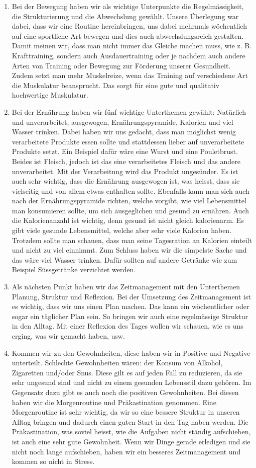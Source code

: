 \begin{enumerate}
  \item Bei der Bewegung haben wir als wichtige Unterpunkte die Regelmässigkeit, die Strukturierung und die Abwechslung gewählt. Unsere Überlegung war dabei, dass wir eine Routine hereinbringen, uns dabei mehrmals wöchentlich auf eine sportliche Art bewegen und dies auch abwechslungsreich gestalten. Damit meinen wir, dass man nicht immer das Gleiche machen muss, wie z. B. Krafttraining, sondern auch Ausdauertraining oder je nachdem auch andere Arten von Training oder Bewegung zur Förderung unserer Gesundheit. Zudem setzt man mehr Muskelreize, wenn das Training auf verschiedene Art die Muskulatur beansprucht. Das sorgt für eine gute und qualitativ hochwertige Muskulatur.
  \item Bei der Ernährung haben wir fünf wichtige Unterthemen gewählt: Natürlich und unverarbeitet, ausgewogen, Ernährungspyramide, Kalorien und viel Wasser trinken. Dabei haben wir uns gedacht, dass man möglichst wenig verarbeitete Produkte essen sollte und stattdessen lieber auf unverarbeitete Produkte setzt. Ein Beispiel dafür wäre eine Wurst und eine Pouletbrust. Beides ist Fleisch, jedoch ist das eine verarbeitetes Fleisch und das andere unverarbeitet. Mit der Verarbeitung wird das Produkt ungesünder. Es ist auch sehr wichtig, dass die Ernährung ausgewogen ist, was heisst, dass sie vielseitig und von allem etwas enthalten sollte. Ebenfalls kann man sich auch nach der Ernährungspyramide richten, welche vorgibt, wie viel Lebensmittel man konsumieren sollte, um sich ausgeglichen und gesund zu ernähren. Auch die Kalorienanzahl ist wichtig, denn gesund ist nicht gleich kalorienarm. Es gibt viele gesunde Lebensmittel, welche aber sehr viele Kalorien haben. Trotzdem sollte man schauen, dass man seine Tagesration an Kalorien einteilt und nicht zu viel einnimmt. Zum Schluss haben wir die simpelste Sache und das wäre viel Wasser trinken. Dafür sollten auf andere Getränke wie zum Beispiel Süssgetränke verzichtet werden.
  \item Als nächsten Punkt haben wir das Zeitmanagement mit den Unterthemen Planung, Struktur und Reflexion. Bei der Umsetzung des Zeitmanagement ist es wichtig, dass wir uns einen Plan machen. Das kann ein wöchentlicher oder sogar ein täglicher Plan sein. So bringen wir auch eine regelmässige Struktur in den Alltag. Mit einer Reflexion des Tages wollen wir schauen, wie es uns erging, was wir gemacht haben, usw.
  \item Kommen wir zu den Gewohnheiten, diese haben wir in Positive und Negative unterteilt. Schlechte Gewohnheiten wären: der Konsum von Alkohol, Zigaretten und/oder Snus. Diese gilt es auf jeden Fall zu reduzieren, da sie sehr ungesund sind und nicht zu einem gesunden Lebensstil dazu gehören. Im Gegensatz dazu gibt es auch noch die positiven Gewohnheiten. Bei diesen haben wir die Morgenroutine und Präkastination genommen. Eine Morgenroutine ist sehr wichtig, da wir so eine bessere Struktur in unseren Alltag bringen und dadurch einen guten Start in den Tag haben werden. Die Präkastination, was soviel heisst, wie die Aufgaben nicht ständig aufschieben, ist auch eine sehr gute Gewohnheit. Wenn wir Dinge gerade erledigen und sie nicht noch lange aufschieben, haben wir ein besseres Zeitmanagement und kommen so nicht in Stress.

\end{enumerate}
